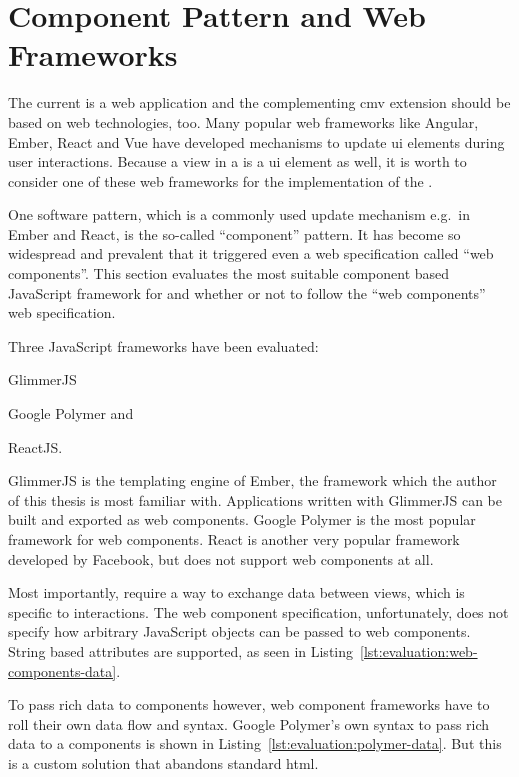 \section{Component Pattern and Web Frameworks}\label{sec:analysis:frontend-framework-comparison}

The current \visan{} is a web application and the complementing \gls{cmv} extension should be based on web technologies, too.
Many popular web frameworks like Angular, Ember, React and Vue have developed mechanisms to update \gls{ui} elements during user interactions.
Because a view in a \cmv{} is a \gls{ui} element as well, it is worth to consider one of these web frameworks for the implementation of the \cmv{}.

One software pattern, which is a commonly used update mechanism e.g.\ in Ember and React, is the so-called ``component'' pattern.
It has become so widespread and prevalent that it triggered even a web specification called “web components”.
This section evaluates the most suitable component based JavaScript framework for \cmvs{} and whether or not to follow the ``web components'' web specification.

Three JavaScript frameworks have been evaluated:
\begin{enumerate*}[label=(\arabic*)]
  \item GlimmerJS
  \item Google Polymer and
  \item ReactJS.
\end{enumerate*}
GlimmerJS is the templating engine of Ember, the framework which the author of this thesis is most familiar with.
Applications written with GlimmerJS can be built and exported as web components.
Google Polymer is the most popular framework for web components.
React is another very popular framework developed by Facebook, but does not support web components at all.

Most importantly, \cmvs{} require a way to exchange data between views, which is specific to interactions.
The web component specification, unfortunately, does not specify how arbitrary JavaScript objects can be passed to web components.
String based attributes are supported, as seen in Listing~\ref{lst:evaluation:web-components-data}.

To pass rich data to components however, web component frameworks have to roll their own data flow and syntax.
Google Polymer's own syntax to pass rich data to a components is shown in Listing~\ref{lst:evaluation:polymer-data}.
But this is a custom solution that abandons standard \gls{html}.


